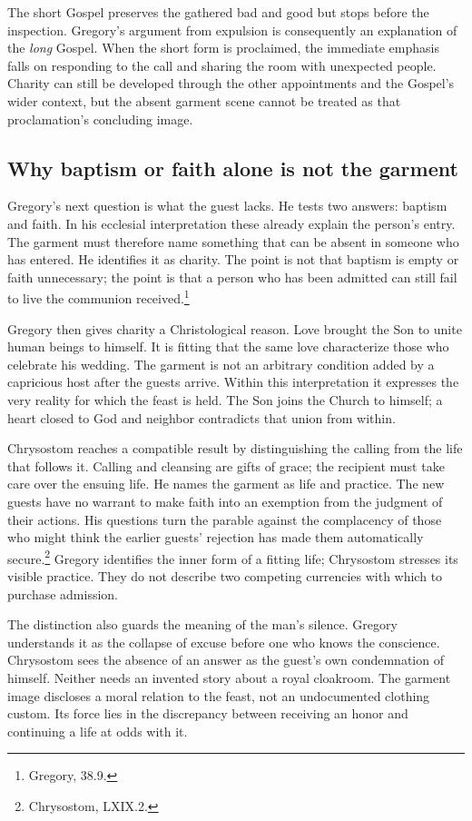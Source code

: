 The short Gospel preserves the gathered bad and good but stops before the inspection. Gregory's argument from expulsion is consequently an explanation of the \emph{long} Gospel. When the short form is proclaimed, the immediate emphasis falls on responding to the call and sharing the room with unexpected people. Charity can still be developed through the other appointments and the Gospel's wider context, but the absent garment scene cannot be treated as that proclamation's concluding image.

\subsection{Why baptism or faith alone is not the garment}
Gregory's next question is what the guest lacks. He tests two answers: baptism and faith. In his ecclesial interpretation these already explain the person's entry. The garment must therefore name something that can be absent in someone who has entered. He identifies it as charity. The point is not that baptism is empty or faith unnecessary; the point is that a person who has been admitted can still fail to live the communion received.\footnote{Gregory,  38.9.}

Gregory then gives charity a Christological reason. Love brought the Son to unite human beings to himself. It is fitting that the same love characterize those who celebrate his wedding. The garment is not an arbitrary condition added by a capricious host after the guests arrive. Within this interpretation it expresses the very reality for which the feast is held. The Son joins the Church to himself; a heart closed to God and neighbor contradicts that union from within.

Chrysostom reaches a compatible result by distinguishing the calling from the life that follows it. Calling and cleansing are gifts of grace; the recipient must take care over the ensuing life. He names the garment as life and practice. The new guests have no warrant to make faith into an exemption from the judgment of their actions. His questions turn the parable against the complacency of those who might think the earlier guests' rejection has made them automatically secure.\footnote{Chrysostom,  LXIX.2.} Gregory identifies the inner form of a fitting life; Chrysostom stresses its visible practice. They do not describe two competing currencies with which to purchase admission.

The distinction also guards the meaning of the man's silence. Gregory understands it as the collapse of excuse before one who knows the conscience. Chrysostom sees the absence of an answer as the guest's own condemnation of himself. Neither needs an invented story about a royal cloakroom. The garment image discloses a moral relation to the feast, not an undocumented clothing custom. Its force lies in the discrepancy between receiving an honor and continuing a life at odds with it.

